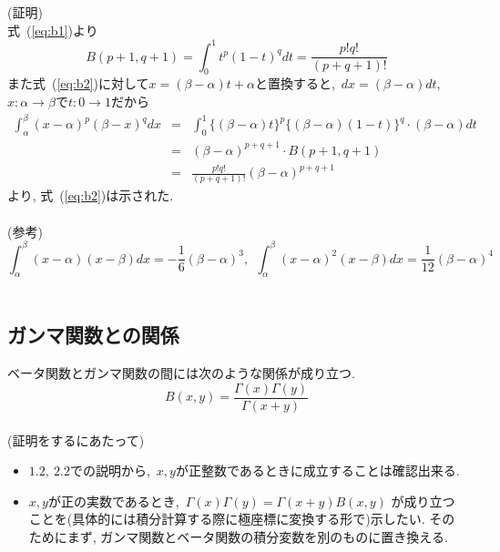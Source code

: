 \documentclass[a4paper,12pt,uplatex,dvipdfmx]{jsarticle}
\begin{document}
(証明) \\
式~(\ref{eq:b1})より
\[
    B(p+1, q+1) = \int_0^1 t^p(1-t)^q dt = \frac{p!q!}{(p+q+1)!}
\]
また式~(\ref{eq:b2})に対して$x = (\beta - \alpha)t + \alpha$と置換すると,~$dx = (\beta - \alpha)dt$,~$x:\alpha \to \beta$で$t:0 \to 1$だから
\begin{eqnarray*}
    \int_{\alpha}^{\beta}(x-\alpha)^{p}(\beta-x)^{q} dx
    & = & \int_0^1 \{(\beta - \alpha)t\}^p\{(\beta - \alpha)(1-t)\}^q \cdot (\beta - \alpha)dt \\
    & = & (\beta - \alpha)^{p+q+1} \cdot B(p+1, q+1) \\
    & = & \frac{p!q!}{(p+q+1)!}(\beta-\alpha)^{p+q+1}
\end{eqnarray*}
より, 式~(\ref{eq:b2})は示された. \\\\

(参考)
\[
    \int_\alpha^\beta (x - \alpha)(x - \beta) dx = -\frac{1}{6}(\beta - \alpha)^3,~~ \int_\alpha^\beta (x - \alpha)^2(x - \beta) dx = \frac{1}{12}(\beta - \alpha)^4
\] \\

\subsection{ガンマ関数との関係}
ベータ関数とガンマ関数の間には次のような関係が成り立つ.
\[
    B(x, y) = \frac{\Gamma(x)\Gamma(y)}{\Gamma(x + y)}
\] \\

(証明をするにあたって)
\begin{itemize}
    \item $1.2,~2.2$での説明から,~$x, y$が正整数であるときに成立することは確認出来る.
    \item $x, y$が正の実数であるとき,~$\Gamma(x)\Gamma(y) = \Gamma(x + y)B(x, y)$ が成り立つことを(具体的には積分計算する際に極座標に変換する形で)示したい. そのためにまず, ガンマ関数とベータ関数の積分変数を別のものに置き換える. \\
\end{itemize}
\end{document}
